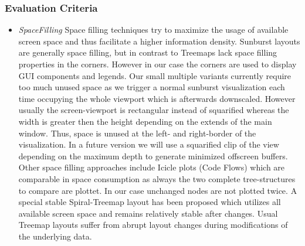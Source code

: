 \subsubsection{Evaluation Criteria}

\begin{itemize}
\item \emph{SpaceFilling} Space filling techniques try to maximize the usage of available screen space and thus facilitate a higher information density. Sunburst layouts are generally space filling, but in contrast to Treemaps lack space filling properties in the corners. However in our case the corners are used to display GUI components and legends. Our small multiple variants currently require too much unused space as we trigger a normal sunburst visualization each time occupying the whole viewport which is afterwards downscaled. However usually the screen-viewport is rectangular instead of squarified whereas the width is greater then the height depending on the extends of the main window. Thus, space is unused at the left- and right-border of the visualization. In a future version we will use a squarified clip of the view depending on the maximum depth to generate minimized offscreen buffers. Other space filling approaches include Icicle plots (Code Flows) which are comparable in space consumption as always the two complete tree-structures to compare are plottet. In our case unchanged nodes are not plotted twice. A special stable Spiral-Treemap layout has been proposed which utilizes all available screen space and remains relatively stable after changes. Usual Treemap layouts suffer from abrupt layout changes during modifications of the underlying data.

\end{itemize}
